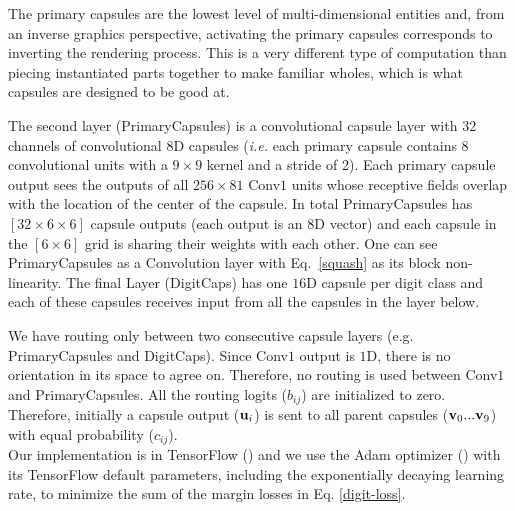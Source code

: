 \documentclass{article}
\begin{document}
The primary capsules are the lowest level of multi-dimensional entities and, from an inverse graphics perspective, activating the primary capsules corresponds to inverting the rendering process. This is a very different type of computation than piecing instantiated parts together to make familiar wholes, which is what capsules are designed to be good at.

The second layer (PrimaryCapsules) is a convolutional capsule layer with $32$ channels of convolutional $8$D capsules ({\it i.e.} each primary capsule contains 8 convolutional units with a $9 \times 9$ kernel and a stride of 2). Each primary capsule output sees the outputs of all $256 \times 81$ Conv$1$ units whose receptive fields overlap with the location of the center of the capsule. In total PrimaryCapsules has $[32 \times 6 \times 6]$ capsule outputs (each output is an $8$D vector) and each capsule in the $[6 \times 6]$ grid is sharing their weights with each other. One can see PrimaryCapsules as a Convolution layer with Eq.~\ref{squash} as its block non-linearity. The final Layer (DigitCaps) has one $16$D capsule per digit class and each of these capsules receives input from all the capsules in the layer below.

We have routing only between two consecutive capsule layers (e.g. PrimaryCapsules and DigitCaps). Since Conv$1$ output is $1$D, there is no orientation in its space to agree on. Therefore, no routing is used between Conv$1$ and PrimaryCapsules. All the routing logits ($b_{ij}$) are initialized to zero. Therefore, initially a capsule output (${\bf u}_i$) is sent to all parent capsules (${\bf v}_0...{\bf v}_{9}$) with equal probability ($c_{ij}$).\\
Our implementation is in TensorFlow (\cite{abadi2016tensorflow}) and we use the Adam optimizer (\cite{kingma2014adam}) with its TensorFlow default parameters, including the exponentially decaying learning rate, to minimize the sum of the margin losses in Eq.  \ref{digit-loss}. 
\end{document}
